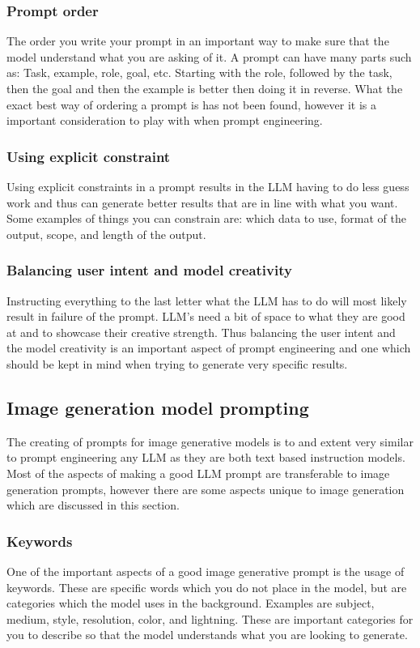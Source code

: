 \subsubsection*{Prompt order}
The order you write your prompt in an important way to make sure that the model understand what you are asking of it. A prompt can have many parts such as: Task, example, role, goal, etc. Starting with the role, followed by the task, then the goal and then the example is better then doing it in reverse. What the exact best way of ordering a prompt is has not been found, however it is a important consideration to play with when prompt engineering.
\subsubsection*{Using explicit constraint}
Using explicit constraints in a prompt results in the LLM having to do less guess work and thus can generate better results that are in line with what you want. Some examples of things you can constrain are: which data to use, format of the output, scope, and length of the output.
\subsubsection*{Balancing user intent and model creativity}
Instructing everything to the last letter what the LLM has to do will most likely result in failure of the prompt. LLM's need a bit of space to what they are good at and to showcase their creative strength. Thus balancing the user intent and the model creativity is an important aspect of prompt engineering and one which should be kept in mind when trying to generate very specific results.


\subsection{Image generation model prompting}
The creating of prompts for image generative models is to and extent very similar to prompt engineering any LLM as they are both text based instruction models. Most of the aspects of making a good LLM prompt are transferable to image generation prompts, however there are some aspects unique to image generation which are discussed in this section.
\subsubsection*{Keywords}
One of the important aspects of a good image generative prompt is the usage of keywords. These are specific words which you do not place in the model, but are categories which the model uses in the background. Examples are subject, medium, style, resolution, color, and lightning. These are important categories for you to describe so that the model understands what you are looking to generate.

